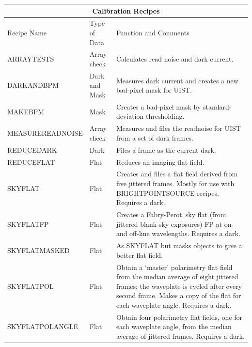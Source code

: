 \documentclass[twoside,11pt]{article}
\newcommand{\htmladdnormallink}[2]{#1}
\newcommand{\htmlref}[2]{#1}
\renewcommand{\_}{\texttt{\symbol{95}}}
\newcommand{\FP}{\htmladdnormallink{Fabry-Perot}{http://www.jach.hawaii.edu/JACpublic/UKIRT/instruments/ufti/ufti_fp.html}}
\begin{document}
\begin{center}
\begin{tabular}{|l|l|p{77mm}|}
\multicolumn{3}{c}{\large{\bf Calibration Recipes}} \vspace*{1ex} \\
\hline
Recipe Name & Type of Data & Function and Comments \\ \hline
\htmlref{ARRAY\_TESTS}{ARRAY\_TESTS} & Array check &
   Calculates read noise and dark current. \\ \hline
\htmlref{DARK\_AND\_BPM}{DARK\_AND\_BPM} & Dark and Mask &
   Measures dark current and creates a new bad-pixel mask for UIST. \\ \hline
\htmlref{MAKE\_BPM}{MAKE\_BPM} & Mask  &
   Creates a bad-pixel mask by standard-deviation thresholding. \\ \hline
\htmlref{MEASURE\_READNOISE}{MEASURE\_READNOISE} & Array check &
   Measures and files the readnoise for UIST from a set of dark frames.\\ \hline
\htmlref{REDUCE\_DARK}{REDUCE\_DARK} & Dark &
   Files a frame as the current dark. \\ \hline
\htmlref{REDUCE\_FLAT}{REDUCE\_FLAT} & Flat &
   Reduces an imaging flat field.\\ \hline
\htmlref{SKY\_FLAT}{SKY\_FLAT} & Flat &
   Creates and files a flat field derived from five jittered frames.
   Mostly for use with BRIGHT\_POINT\_SOURCE recipes. Requires a
   dark.\\ \hline
\htmlref{SKY\_FLAT\_FP}{SKY\_FLAT\_FP} & Flat &
   Creates a \FP\ sky flat (from jittered blank-sky exposures) 
   FP at on- and off-line wavelengths.  Requires a dark. \\ \hline
\htmlref{SKY\_FLAT\_MASKED}{SKY\_FLAT\_MASKED} & Flat &
   As SKY\_FLAT but masks objects to give a better flat field. \\ \hline
\htmlref{SKY\_FLAT\_POL}{SKY\_FLAT\_POL} & Flat &
   Obtain a `master' polarimetry flat field from the median average
   of eight jittered frames; the waveplate is cycled after
   every second frame.  Makes a copy of the flat for each
   waveplate angle. Requires a dark.\\ \hline
\htmlref{SKY\_FLAT\_POL\_ANGLE}{SKY\_FLAT\_POL\_ANGLE} & Flat &
   Obtain four polarimetry flat fields, one for each waveplate angle,
   from the median average of jittered frames. Requires a dark.\\ \hline
\end{tabular}
\end{center}
\end{document}
